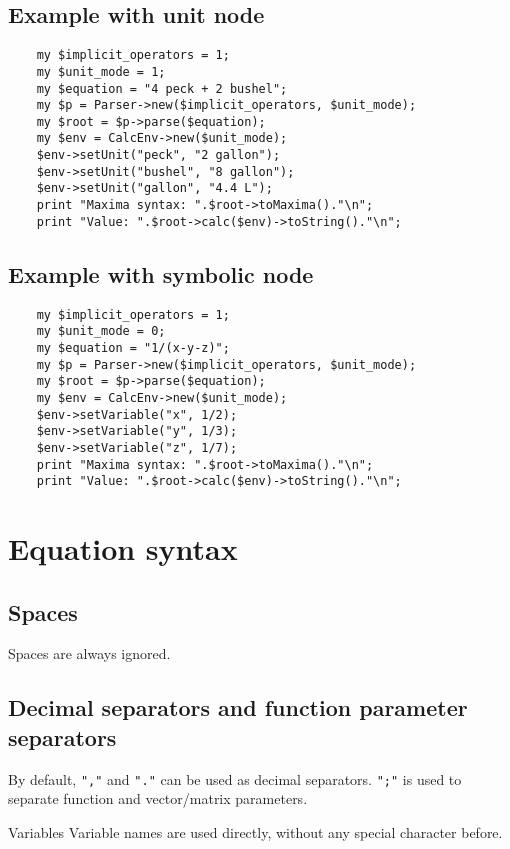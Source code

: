 \subsection{Example with unit node}
\begin{verbatim}
    my $implicit_operators = 1;
    my $unit_mode = 1;
    my $equation = "4 peck + 2 bushel";
    my $p = Parser->new($implicit_operators, $unit_mode);
    my $root = $p->parse($equation);
    my $env = CalcEnv->new($unit_mode);
    $env->setUnit("peck", "2 gallon");
    $env->setUnit("bushel", "8 gallon");
    $env->setUnit("gallon", "4.4 L");
    print "Maxima syntax: ".$root->toMaxima()."\n";
    print "Value: ".$root->calc($env)->toString()."\n";
\end{verbatim}

\subsection{Example with symbolic node}
\begin{verbatim}
    my $implicit_operators = 1;
    my $unit_mode = 0;
    my $equation = "1/(x-y-z)";
    my $p = Parser->new($implicit_operators, $unit_mode);
    my $root = $p->parse($equation);
    my $env = CalcEnv->new($unit_mode);
    $env->setVariable("x", 1/2);
    $env->setVariable("y", 1/3);
    $env->setVariable("z", 1/7);
    print "Maxima syntax: ".$root->toMaxima()."\n";
    print "Value: ".$root->calc($env)->toString()."\n";
\end{verbatim}


\section{Equation syntax}

\subsection{Spaces}
Spaces are always ignored.

\subsection{Decimal separators and function parameter separators}
By default, \texttt{","} and \texttt{"."} can be used as decimal separators.
\texttt{";"} is used to separate function and vector/matrix parameters.

Variables
Variable names are used directly, without any special character before.

